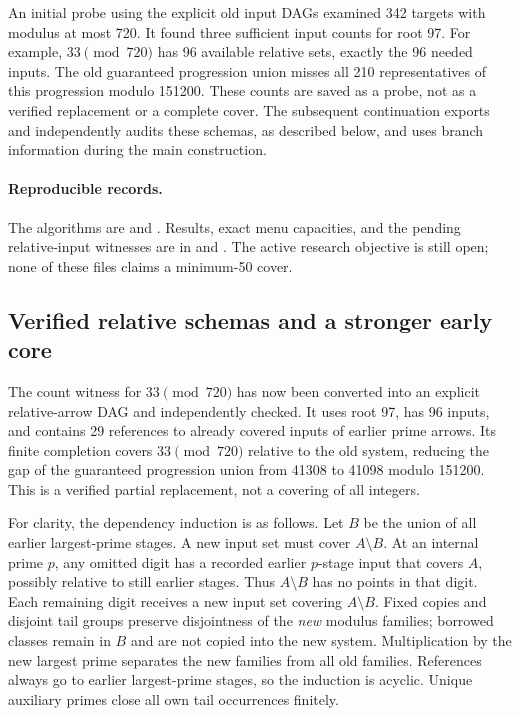 \documentclass[11pt]{article}
\begin{document}
An initial probe using the explicit old input DAGs examined 342 targets
with modulus at most 720. It found three sufficient input counts for root
97. For example, $33\pmod{720}$ has 96 available relative sets, exactly
the 96 needed inputs. The old guaranteed progression union misses all
210 representatives of this progression modulo 151200. These counts are
saved as a probe, not as a verified replacement or a complete cover.
The subsequent continuation exports and independently audits these schemas,
as described below, and uses branch information during the main construction.

\paragraph{Reproducible records.}
The algorithms are  and
. Results, exact menu capacities, and
the pending relative-input witnesses are in
 and
. The active research
objective is still open; none of these files claims a minimum-50 cover.

\subsection{Verified relative schemas and a stronger early core}
The count witness for $33\pmod{720}$ has now been converted into an explicit
relative-arrow DAG and independently checked. It uses root 97, has 96
inputs, and contains 29 references to already covered inputs of earlier
prime arrows. Its finite completion covers $33\pmod{720}$ relative to the
old system, reducing the gap of the guaranteed progression union from
41308 to 41098 modulo 151200. This is a verified partial replacement, not
a covering of all integers.

For clarity, the dependency induction is as follows. Let $B$ be the union
of all earlier largest-prime stages. A new input set must cover $A\setminus B$.
At an internal prime $p$, any omitted digit has a recorded earlier $p$-stage
input that covers $A$, possibly relative to still earlier stages. Thus
$A\setminus B$ has no points in that digit. Each remaining digit receives
a new input set covering $A\setminus B$. Fixed copies and disjoint tail
groups preserve disjointness of the \emph{new} modulus families; borrowed
classes remain in $B$ and are not copied into the new system. Multiplication
by the new largest prime separates the new families from all old families.
References always go to earlier largest-prime stages, so the induction is
acyclic. Unique auxiliary primes close all own tail occurrences finitely.
\end{document}
